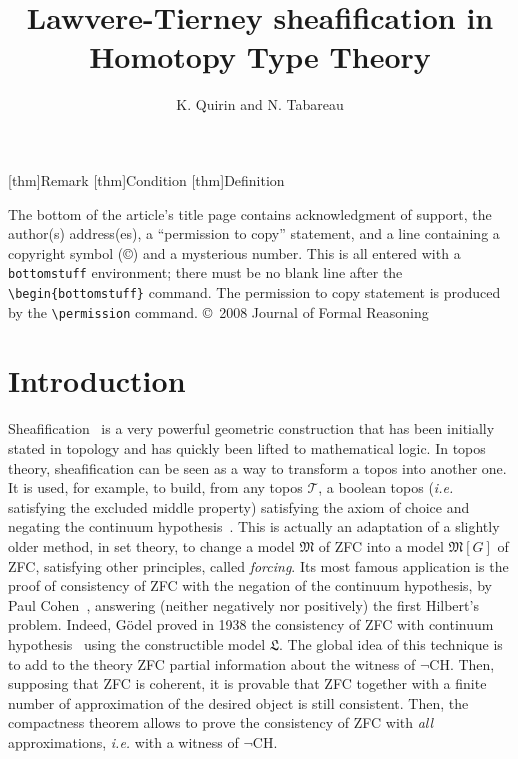 \documentclass[notfinal]{jfrarticle}
\title{Lawvere-Tierney sheafification in Homotopy Type Theory}
\author{K. Quirin and N. Tabareau}
{Kevin Quirin\\ \'{E}cole des Mines de Nantes, France
  \and
  Nicolas Tabareau\\Inria, France}
\newcommand{\ie}{\emph{i.e.}}
\begin{document}
\newtheorem{thm}{Theorem}[section]
\newtheorem{prop}[thm]{Proposition}%
\newtheorem{lem}[thm]{Lemma}%
[thm]{Remark}%
[thm]{Condition}%
[thm]{Definition}%


\begin{bottomstuff}

The bottom of the article's title page contains acknowledgment of
support, the author(s) address(es), a ``permission to copy'' statement,
and a line containing a copyright symbol (\copyright) and a mysterious
number.  This is all entered with a {\tt bottomstuff} environment;
there must be no blank line after the \verb|\begin{bottomstuff}|
command.  The permission to copy statement is produced by the
\verb|\permission| command.
\permission
\copyright\ 2008 Journal of Formal Reasoning
\end{bottomstuff}

\maketitle

\section{Introduction}


Sheafification~\cite{maclanemoerdijk} is a very powerful geometric
construction that has been initially stated in topology and has
quickly been lifted to mathematical logic.
%
In topos theory, sheafification can be seen as a way to transform a
topos into another one. It is used, for example, to build, from any
topos $\mathcal T$, a boolean topos (\ie{} satisfying the excluded
middle property) satisfying the axiom of choice and negating the
continuum hypothesis~\cite[Theorem VI.2.1]{maclanemoerdijk}.
This is actually an adaptation of a slightly older method, in set
theory, to change a model $\mathfrak M$ of ZFC into a model $\mathfrak
M[G]$ of ZFC, satisfying other principles, called {\em forcing}. Its
most famous application is the proof of consistency of ZFC with the
negation of the continuum hypothesis, by Paul Cohen~\cite{cohen1966},
answering (neither negatively nor positively) the first Hilbert's
problem. Indeed, Gödel proved in 1938 the consistency of ZFC with
continuum hypothesis~\cite{godel1938} using the constructible model
$\mathfrak L$.
The global idea of this technique is to add to the theory
ZFC partial information about the witness of $\lnot$CH. 
Then, supposing that ZFC is coherent, it is provable that ZFC together
with a finite number of approximation of the desired object is still
consistent. Then, the compactness theorem allows to prove the
consistency of ZFC with {\em all} approximations, \ie{} with a witness
of $\lnot$CH.
\end{document}
